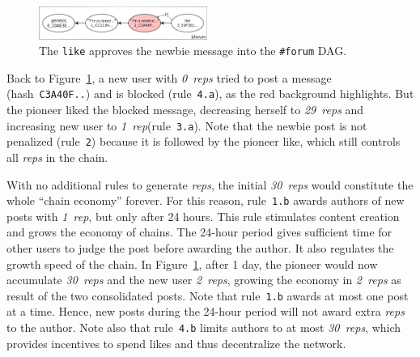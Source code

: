 \documentclass[10pt,journal,compsoc]{IEEEtran}
\newcommand{\reps}     {\emph{reps}\xspace}
\newcommand{\onerep}   {\emph{1~rep}\xspace}
\newcommand{\nreps}[1] {\emph{#1~reps\xspace}}
\begin{document}
\begin{figure}
\centering
\includegraphics[width=0.49\textwidth]{forum.png}
\caption{
    The \texttt{like} approves the newbie message into the \texttt{\#forum} DAG.
}
\label{fig.forum}
\end{figure}

Back to Figure~\ref{fig.forum}, a new user with \nreps{0} tried to post a
message (hash~\texttt{C3A40F..}) and is blocked (rule~\texttt{4.a}), as the red
background highlights.
But the pioneer liked the blocked message, decreasing herself to \nreps{29}
and increasing new user to \onerep (rule~\texttt{3.a}).
Note that the newbie post is not penalized (rule~\texttt{2}) because it is
followed by the pioneer like, which still controls all \reps in the chain.

With no additional rules to generate \reps, the initial \nreps{30} would
constitute the whole ``chain economy'' forever.
For this reason, rule~\texttt{1.b} awards authors of new posts with \onerep,
but only after 24 hours.
This rule stimulates content creation and grows the economy of chains.
The 24-hour period gives sufficient time for other users to judge the post
before awarding the author.
It also regulates the growth speed of the chain.
In Figure~\ref{fig.forum}, after 1 day, the pioneer would now accumulate
\nreps{30} and the new user \nreps{2}, growing the economy in \nreps{2} as
result of the two consolidated posts.
Note that rule~\texttt{1.b} awards at most one post at a time.
Hence, new posts during the 24-hour period will not award extra \reps to the
author.
Note also that rule~\texttt{4.b} limits authors to at most \nreps{30}, which
provides incentives to spend likes and thus decentralize the network.
\end{document}
